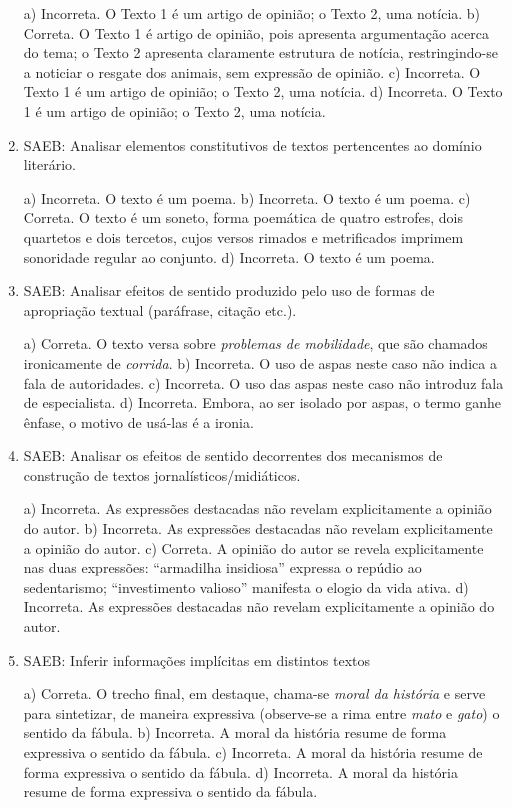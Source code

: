 \begin{enumerate}
a) Incorreta. O Texto 1 é um artigo de opinião; o Texto 2, uma notícia.
b) Correta. O Texto 1 é artigo de opinião, pois apresenta
argumentação acerca do tema; o Texto 2 apresenta claramente estrutura
de notícia, 
restringindo-se a noticiar o resgate dos animais, sem expressão de 
opinião. 
c) Incorreta. O Texto 1 é um artigo de opinião; o Texto 2, uma notícia.
d) Incorreta. O Texto 1 é um artigo de opinião; o Texto 2, uma notícia.

	\item
SAEB: Analisar elementos constitutivos de textos pertencentes ao domínio
literário.

a) Incorreta. O texto é um poema.
b) Incorreta. O texto é um poema.
c) Correta. O texto é um soneto, forma poemática de quatro estrofes, 
dois quartetos e dois tercetos, cujos versos rimados e metrificados 
imprimem sonoridade regular ao conjunto. 
d) Incorreta. O texto é um poema.

	\item
SAEB: Analisar efeitos de sentido produzido pelo uso de formas
de apropriação textual (paráfrase, citação etc.).

a) Correta. O texto versa sobre \textit{problemas de mobilidade}, que são chamados ironicamente de \textit{corrida}.
b) Incorreta. O uso de aspas neste caso não indica a fala de
autoridades.
c) Incorreta. O uso das aspas neste caso não introduz fala
de especialista.
d) Incorreta. Embora, ao ser isolado por aspas, o termo ganhe ênfase, o motivo de usá-las é a ironia.

	\item
SAEB: Analisar os efeitos de sentido decorrentes dos mecanismos de 
construção de textos jornalísticos/midiáticos.

a) Incorreta. As expressões destacadas não revelam explicitamente a opinião do autor.
b) Incorreta. As expressões destacadas não revelam explicitamente a opinião do autor.
c) Correta. A opinião do autor se revela explicitamente nas duas expressões: ``armadilha insidiosa'' expressa o repúdio ao sedentarismo; ``investimento valioso'' manifesta o elogio da vida ativa.
d) Incorreta. As expressões destacadas não revelam explicitamente a opinião do autor.

	\item
SAEB: Inferir informações implícitas em distintos textos

a) Correta. O trecho final, em destaque, chama-se \textit{moral da história}
e serve para sintetizar, de maneira expressiva (observe-se a rima entre
\textit{mato} e \textit{gato}) o sentido da fábula. 
b) Incorreta. A moral da história resume de forma expressiva o sentido da 
fábula.
c) Incorreta. A moral da história resume de forma expressiva o sentido da 
fábula.
d) Incorreta. A moral da história resume de forma expressiva o sentido da 
fábula.


\end{enumerate}
